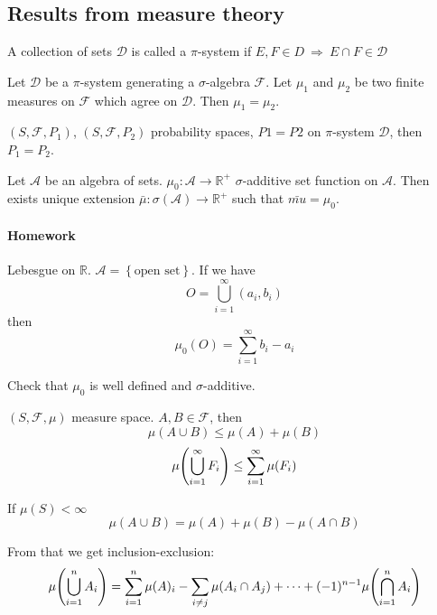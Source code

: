 \subsection{Results from measure theory}
\begin{definition}
	A collection of sets $\mathcal{D}$ is called a $\pi$-system if $E,F \in D \: \Rightarrow \: E\cap F \in \mathcal{D}$
\end{definition}
\begin{theorem}[Uniqness]
	Let $\mathcal{D}$ be a $\pi$-system generating a $\sigma$-algebra $\mathcal{F}$. Let $\mu_1$ and $\mu_2$ be two finite measures on $\mathcal{F}$ which agree on $\mathcal{D}$. Then $\mu_1=\mu_2$.
	
	\begin{coll}
		$(S,\mathcal{F}, P_1)$, $(S,\mathcal{F}, P_2)$ probability spaces, $P1=P2$ on $\pi$-system $\mathcal{D}$, then $P_1=P_2$.
	\end{coll}
\end{theorem}

\begin{theorem}
	Let $\mathcal{A}$ be an algebra of sets. $\mu_0: \mathcal{A} \to \mathbb{R}^+$ $\sigma$-additive set function on $\mathcal{A}$. Then exists unique extension $\bar{\mu} : \sigma(\mathcal{A}) \to \mathbb{R}^+ $ such that $\bar{mu} = \mu_0$.
\end{theorem}

\paragraph{Homework}
Lebesgue on $\mathbb{R}$.  $\mathcal{A} = \left\{ \text{open set} \right\}$. If we have
$$O = \bigcup_{i=1}^\infty (a_i, b_i)$$
then
$$\mu_0(O) = \sum_{i=1}^\infty b_i-a_i$$

Check that $\mu_0$ is well defined and $\sigma$-additive.

\begin{lemma}
	
	$(S,\mathcal{F}, \mu)$ measure space. $A,B \in \mathcal{F}$, then
	$$\mu(A\cup B) \leq \mu(A) + \mu(B) $$
	$$\mu\qty(\bigcup_{i=1}^\infty F_i) \leq \sum_{i=1}^\infty \mu(F_i) $$
	
	If $\mu(S) < \infty$
	$$\mu(A\cup B) = \mu(A) + \mu(B) - \mu(A\cap B)$$
	
	From that we get inclusion-exclusion:
	$$\mu\qty(\bigcup_{i=1}^n A_i) = \sum_{i=1}^n \mu(A)_i - \sum_{i\neq j}\mu(A_i\cap A_j) + \dots + (-1)^{n-1} \mu\qty(\bigcap_{i=1}^n A_i)$$
\end{lemma}
